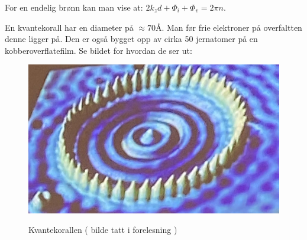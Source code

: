\documentclass{article}
\begin{document}
For en endelig brønn kan man vise at: $2k_z d + \Phi_i + \Phi_v = 2\pi n$.

En kvantekorall har en diameter på $\approx 70 Å$. Man før frie elektroner på overfaltten denne ligger på. Den er også bygget opp av cirka 50 jernatomer på en kobberoverflatefilm. Se bildet for hvordan de ser ut:
\begin{figure}[h]
  \centering
  \caption{Kvantekorallen ( bilde tatt i forelesning )}
  \includegraphics[scale=0.4]{bilder/kvantekorallen.jpg}
  \label{fig:kvantekorallen}
\end{figure}
\end{document}
